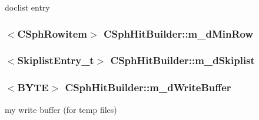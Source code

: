 doclist entry 

\hypertarget{classCSphHitBuilder_aaff44dbc2bd11c9b3cd40d0beee07b16}{
\subsubsection[{m\-\_\-d\-Min\-Row}]{$<${\bf C\-Sph\-Rowitem}$>$ C\-Sph\-Hit\-Builder\-::m\-\_\-d\-Min\-Row\hspace{0.3cm}{\ttfamily [private]}}}\label{classCSphHitBuilder_aaff44dbc2bd11c9b3cd40d0beee07b16}
\hypertarget{classCSphHitBuilder_a4207caaa773f50263a35ff104e2a8c3f}{
\subsubsection[{m\-\_\-d\-Skiplist}]{$<${\bf Skiplist\-Entry\-\_\-t}$>$ C\-Sph\-Hit\-Builder\-::m\-\_\-d\-Skiplist\hspace{0.3cm}{\ttfamily [private]}}}\label{classCSphHitBuilder_a4207caaa773f50263a35ff104e2a8c3f}
\hypertarget{classCSphHitBuilder_a8cbbb9538f110fe5b434266164f97f22}{
\subsubsection[{m\-\_\-d\-Write\-Buffer}]{$<${\bf B\-Y\-T\-E}$>$ C\-Sph\-Hit\-Builder\-::m\-\_\-d\-Write\-Buffer\hspace{0.3cm}{\ttfamily [private]}}}\label{classCSphHitBuilder_a8cbbb9538f110fe5b434266164f97f22}


my write buffer (for temp files) 

